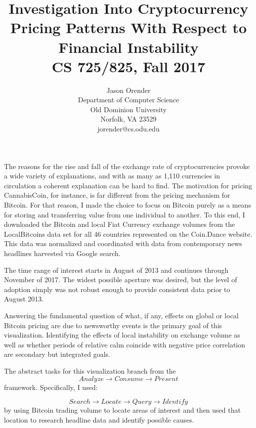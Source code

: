 \documentclass[journal]{vgtc}                %
\title{Investigation Into Cryptocurrency Pricing Patterns With Respect to Financial Instability \\
CS 725/825, Fall 2017}
\author{Jason Orender\\
Department of Computer Science\\
Old Dominion University\\
Norfolk, VA 23529\\
jorender@cs.odu.edu
}
\begin{document}


\maketitle

The reasons for the rise and fall of the exchange rate of cryptocurrencies provoke a wide variety of explanations\cite{ftepper-1,rviglione-1}, and with as many as 1,110 currencies in circulation\cite{ditkis-1} a coherent explanation can be hard to find.  The motivation for pricing CannabisCoin\cite{alex-1}, for instance, is far different from the pricing mechanism for Bitcoin.  For that reason, I made the choice to focus on Bitcoin purely as a means for storing and transferring value from one individual to another.  To this end, I downloaded the Bitcoin and local Fiat Currency exchange volumes from the LocalBitcoins data set for all 46 countries represented on the Coin.Dance website\cite{coind-1}.  This data was normalized and coordinated with data from contemporary news headlines harvested via Google search.  

The time range of interest starts in August of 2013 and continues through November of 2017. The widest possible aperture was desired, but the level of adoption simply was not robust enough to provide consistent data prior to August 2013.

Answering the fundamental question of what, if any, effects on global or local Bitcoin pricing are due to newsworthy events is the primary goal of this visualization.  Identifying the effects of local instability on exchange volume as well as whether periods of relative calm coincide with negative price correlation are secondary but integrated goals.

The abstract tasks for this visualization branch from the 
\begin{equation}\label{key}
Analyze \rightarrow Consume \rightarrow Present 
\end{equation}
framework.  Specifically, I used:

\begin{equation}\label{key}
Search \rightarrow  Locate \rightarrow Query \rightarrow Identify
\end{equation}
by using Bitcoin trading volume to locate areas of interest and then used that location to research headline data and identify possible causes.
\end{document}
